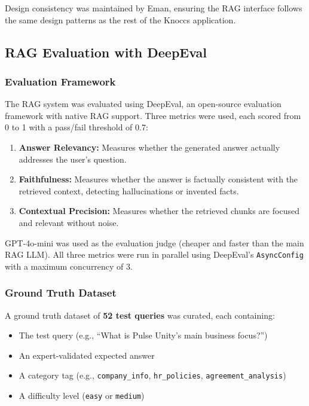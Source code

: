 Design consistency was maintained by Eman, ensuring the RAG interface follows the same design patterns as the rest of the Knoccs application.

\subsection{RAG Evaluation with DeepEval}

\subsubsection{Evaluation Framework}

The RAG system was evaluated using DeepEval, an open-source evaluation framework with native RAG support. Three metrics were used, each scored from 0 to 1 with a pass/fail threshold of 0.7:

\begin{enumerate}
    \item \textbf{Answer Relevancy:} Measures whether the generated answer actually addresses the user's question.
    \item \textbf{Faithfulness:} Measures whether the answer is factually consistent with the retrieved context, detecting hallucinations or invented facts.
    \item \textbf{Contextual Precision:} Measures whether the retrieved chunks are focused and relevant without noise.
\end{enumerate}

GPT-4o-mini was used as the evaluation judge (cheaper and faster than the main RAG LLM). All three metrics were run in parallel using DeepEval's \texttt{AsyncConfig} with a maximum concurrency of 3.

\subsubsection{Ground Truth Dataset}

A ground truth dataset of \textbf{52 test queries} was curated, each containing:
\begin{itemize}
    \item The test query (e.g., ``What is Pulse Unity's main business focus?'')
    \item An expert-validated expected answer
    \item A category tag (e.g., \texttt{company\_info}, \texttt{hr\_policies}, \texttt{agreement\_analysis})
    \item A difficulty level (\texttt{easy} or \texttt{medium})
\end{itemize}

